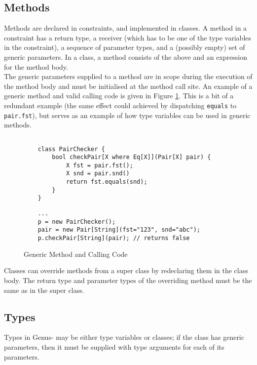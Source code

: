 \subsection{Methods}

Methods are declared in constraints, and implemented in classes. A method in a constraint has a return type, a receiver (which has to be one of the type variables in the constraint), a sequence of parameter types, and a (possibly empty) set of generic parameters. In a class, a method consists of the above and an expression for the method body. \\

The generic parameters supplied to a method are in scope during the execution of the method body and must be initialised at the method call site. An example of a generic method and valid calling code is given in Figure \ref{fig:generic-method}. This is a bit of a redundant example (the same effect could achieved by dispatching \texttt{equals} to \texttt{pair.fst}), but serves as an example of how type variables can be used in generic methods. \\

\begin{figure}[h]
    \centering
    \begin{verbatim}
    
    class PairChecker {
        bool checkPair[X where Eq[X]](Pair[X] pair) {
            X fst = pair.fst();
            X snd = pair.snd()
            return fst.equals(snd);
        }
    }
    \end{verbatim}
    
    \begin{verbatim}
    ...
    p = new PairChecker();
    pair = new Pair[String](fst="123", snd="abc");
    p.checkPair[String](pair); // returns false
    \end{verbatim}
    \caption{Generic Method and Calling Code}
    \label{fig:generic-method}
\end{figure}

Classes can override methods from a super class by redeclaring them in the class body. The return type and parameter types of the overriding method must be the same as in the super class. 

\subsection{Types} \label{sec:genus-types}

Types in Genus- may be either type variables or classes; if the class has generic parameters, then it must be supplied with type arguments for each of its parameters.

